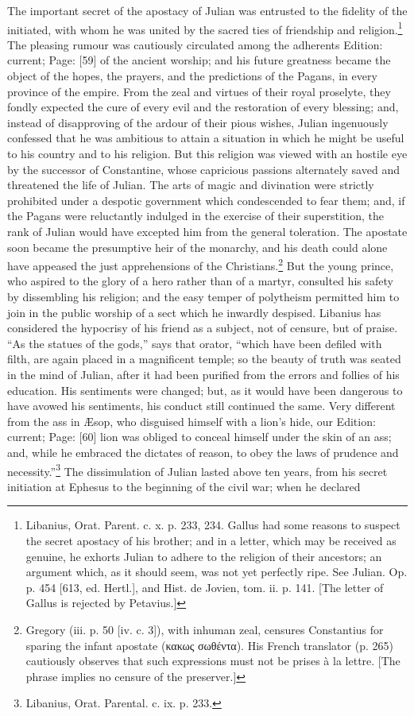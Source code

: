 The important secret of the apostacy of Julian was entrusted to the fidelity of the initiated, with whom he was united by the sacred ties of friendship and religion.\footnote{Libanius, Orat. Parent. c. x. p. 233, 234. Gallus had some reasons to suspect the secret apostacy of his brother; and in a letter, which may be received as genuine, he exhorts Julian to adhere to the religion of their ancestors; an argument which, as it should seem, was not yet perfectly ripe. See Julian. Op. p. 454 [613, ed. Hertl.], and Hist. de Jovien, tom. ii. p. 141. [The letter of Gallus is rejected by Petavius.]} The pleasing rumour was cautiously circulated among the adherents Edition: current; Page: [59] of the ancient worship; and his future greatness became the object of the hopes, the prayers, and the predictions of the Pagans, in every province of the empire. From the zeal and virtues of their royal proselyte, they fondly expected the cure of every evil and the restoration of every blessing; and, instead of disapproving of the ardour of their pious wishes, Julian ingenuously confessed that he was ambitious to attain a situation in which he might be useful to his country and to his religion. But this religion was viewed with an hostile eye by the successor of Constantine, whose capricious passions alternately saved and threatened the life of Julian. The arts of magic and divination were strictly prohibited under a despotic government which condescended to fear them; and, if the Pagans were reluctantly indulged in the exercise of their superstition, the rank of Julian would have excepted him from the general toleration. The apostate soon became the presumptive heir of the monarchy, and his death could alone have appeased the just apprehensions of the Christians.\footnote{Gregory (iii. p. 50 [iv. c. 3]), with inhuman zeal, censures Constantius for sparing the infant apostate (\textgreek{κακως σωθέντα}). His French translator (p. 265) cautiously observes that such expressions must not be prises à la lettre. [The phrase implies no censure of the preserver.]} But the young prince, who aspired to the glory of a hero rather than of a martyr, consulted his safety by dissembling his religion; and the easy temper of polytheism permitted him to join in the public worship of a sect which he inwardly despised. Libanius has considered the hypocrisy of his friend as a subject, not of censure, but of praise. \texthebrew{“}As the statues of the gods,\texthebrew{}” says that orator, \texthebrew{“}which have been defiled with filth, are again placed in a magnificent temple; so the beauty of truth was seated in the mind of Julian, after it had been purified from the errors and follies of his education. His sentiments were changed; but, as it would have been dangerous to have avowed his sentiments, his conduct still continued the same. Very different from the ass in Æsop, who disguised himself with a lion\texthebrew{}’s hide, our Edition: current; Page: [60] lion was obliged to conceal himself under the skin of an ass; and, while he embraced the dictates of reason, to obey the laws of prudence and necessity.\texthebrew{}”\footnote{Libanius, Orat. Parental. c. ix. p. 233.} The dissimulation of Julian lasted above ten years, from his secret initiation at Ephesus to the beginning of the civil war; when he declared 